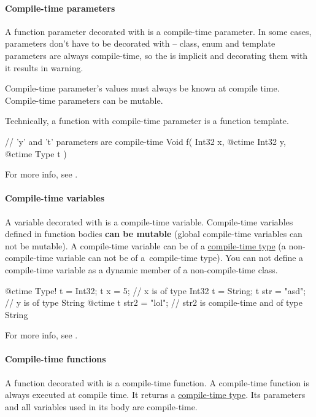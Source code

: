 \paragraph{Compile-time parameters}
A function parameter decorated with  is a compile-time parameter. In some cases, parameters don't have to be decorated with  -- class, enum and template parameters are always compile-time, so the  is implicit and decorating them with it results in warning.

Compile-time parameter's values must always be known at compile time. Compile-time parameters can be mutable.

Technically, a function with compile-time parameter is a function template.

\begin{code}
// 'y' and 't' parameters are compile-time
Void f( Int32 x, @ctime Int32 y, @ctime Type t ) {
	
}
\end{code}

For more info, see .

\paragraph{Compile-time variables}
A variable decorated with  is a compile-time variable. Compile-time variables defined in function bodies \textbf{can be mutable} (global compile-time variables can not be mutable). A compile-time variable can be of a \hyperref[ctime:class]{compile-time type} (a non-compile-time variable can not be of a~compile-time type). You can not define a compile-time variable as a dynamic member of a non-compile-time class.

\begin{code}
@ctime Type! t = Int32;
t x = 5; // x is of type Int32
t = String;
t str = "asd"; // y is of type String
@ctime t str2 = "lol"; // str2 is compile-time and of type String
\end{code}

For more info, see .

\paragraph{Compile-time functions}
A function decorated with  is a compile-time function. A compile-time function is always executed at compile time. It returns a \hyperref[ctime:class]{compile-time type}. Its parameters and all variables used in its body are compile-time.

